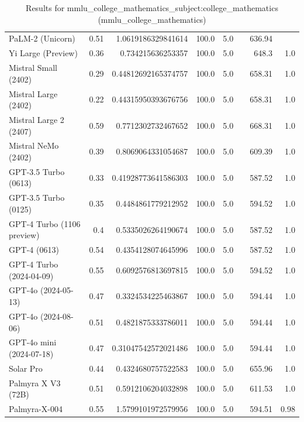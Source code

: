 \begin{table}[htp]
{\begin{tabular}{lrrrrrrr}
PaLM-2 (Unicorn) & 0.51 & 1.0619186329841614 & 100.0 & 5.0 &  & 636.94 &  \\
Yi Large (Preview) & 0.36 & 0.734215636253357 & 100.0 & 5.0 &  & 648.3 & 1.0 \\
Mistral Small (2402) & 0.29 & 0.44812692165374757 & 100.0 & 5.0 &  & 658.31 & 1.0 \\
Mistral Large (2402) & 0.22 & 0.44315950393676756 & 100.0 & 5.0 &  & 658.31 & 1.0 \\
Mistral Large 2 (2407) & 0.59 & 0.7712302732467652 & 100.0 & 5.0 &  & 668.31 & 1.0 \\
Mistral NeMo (2402) & 0.39 & 0.8069064331054687 & 100.0 & 5.0 &  & 609.39 & 1.0 \\
GPT-3.5 Turbo (0613) & 0.33 & 0.41928773641586303 & 100.0 & 5.0 &  & 587.52 & 1.0 \\
GPT-3.5 Turbo (0125) & 0.35 & 0.4484861779212952 & 100.0 & 5.0 &  & 594.52 & 1.0 \\
GPT-4 Turbo (1106 preview) & 0.4 & 0.5335026264190674 & 100.0 & 5.0 &  & 587.52 & 1.0 \\
GPT-4 (0613) & 0.54 & 0.4354128074645996 & 100.0 & 5.0 &  & 587.52 & 1.0 \\
GPT-4 Turbo (2024-04-09) & 0.55 & 0.6092576813697815 & 100.0 & 5.0 &  & 594.52 & 1.0 \\
GPT-4o (2024-05-13) & 0.47 & 0.3324534225463867 & 100.0 & 5.0 &  & 594.44 & 1.0 \\
GPT-4o (2024-08-06) & 0.51 & 0.4821875333786011 & 100.0 & 5.0 &  & 594.44 & 1.0 \\
GPT-4o mini (2024-07-18) & 0.47 & 0.31047542572021486 & 100.0 & 5.0 &  & 594.44 & 1.0 \\
Solar Pro & 0.44 & 0.4324680757522583 & 100.0 & 5.0 &  & 655.96 & 1.0 \\
Palmyra X V3 (72B) & 0.51 & 0.5912106204032898 & 100.0 & 5.0 &  & 611.53 & 1.0 \\
Palmyra-X-004 & 0.55 & 1.5799101972579956 & 100.0 & 5.0 &  & 594.51 & 0.98 \\
\bottomrule
\end{tabular}}
\caption{Results for mmlu_college_mathematics_subject:college_mathematics (mmlu_college_mathematics)}
\label{fig:mmlu_college_mathematics_subject:college_mathematics (mmlu_college_mathematics)}
\end{table}